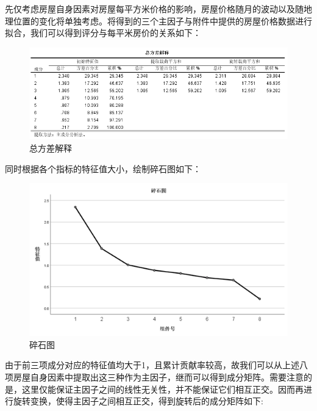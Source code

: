 \documentclass[withoutpreface,bwprint]{cumcmthesis} %
\begin{document}
先仅考虑房屋自身因素对房屋每平方米价格的影响，房屋价格随月的波动以及随地理位置的变化将单独考虑。将得到的三个主因子与附件中提供的房屋价格数据进行拟合，我们可以得到评分与每平米房价的关系如下：

\begin{figure}[H]
    \centering
    \includegraphics[scale=0.8]{总方差解释.png}
    \caption{总方差解释}
    \label{fig:总方差解释}
\end{figure}
同时根据各个指标的特征值大小，绘制碎石图如下：
\begin{figure}[H]
    \centering
    \includegraphics[scale=0.7]{碎石图.png}
    \caption{碎石图}
    \label{fig:碎石图}
\end{figure}
由于前三项成分对应的特征值均大于1，且累计贡献率较高，故我们可以从上述八项房屋自身因素中提取出这三种作为主因子，继而可以得到成分矩阵。需要注意的是，这里仅能保证主因子之间的线性无关性，并不能保证它们相互正交。因而再进行旋转变换，使得主因子之间相互正交，得到旋转后的成分矩阵如下:
\end{document}
